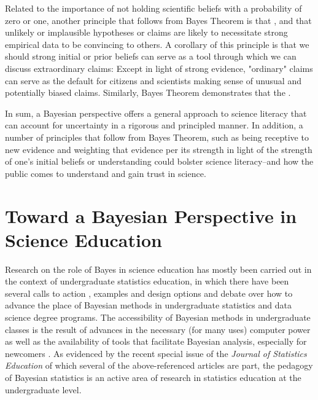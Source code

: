 \documentclass[man]{apa7}
\begin{document}
Related to the importance of not holding scientific beliefs with a probability of zero or one, another principle that follows from Bayes Theorem is that , and that unlikely or implausible hypotheses or claims are likely to necessitate strong empirical data to be convincing to others. A corollary of this principle is that we should strong initial or prior beliefs can serve as a tool through which we can discuss extraordinary claims: Except in light of strong evidence, "ordinary" claims can serve as the default for citizens and scientists making sense of unusual and potentially biased claims. Similarly, Bayes Theorem demonstrates that the . 

In sum, a Bayesian perspective offers a general approach to science literacy that can account for uncertainty in a rigorous and principled manner. In addition, a number of principles that follow from Bayes Theorem, such as being receptive to new evidence and weighting that evidence per its strength in light of the strength of one's initial beliefs or understanding could bolster science literacy--and how the public comes to understand and gain trust in science.

\section{Toward a Bayesian Perspective in Science Education}

Research on the role of Bayes in science education has mostly been carried out in the context of undergraduate statistics education, in which there have been several calls to action \parencite{gpkpwc18, h_a20}, examples and design options \parencite{a02, b02,g08, w17, h_j20} and debate \parencite{jrhrr20} over how to advance the place of Bayesian methods in undergraduate statistics and data science degree programs. The accessibility of Bayesian methods in undergraduate classes is the result of advances in the necessary (for many uses) computer power \parencite{gpkpwc18} as well as the availability of tools that facilitate Bayesian analysis, especially for newcomers \parencite{ah20}. As evidenced by the recent special issue of the \emph{Journal of Statistics Education} of which several of the above-referenced articles are part, the pedagogy of Bayesian statistics is an active area of research in statistics education at the undergraduate level.
\end{document}
